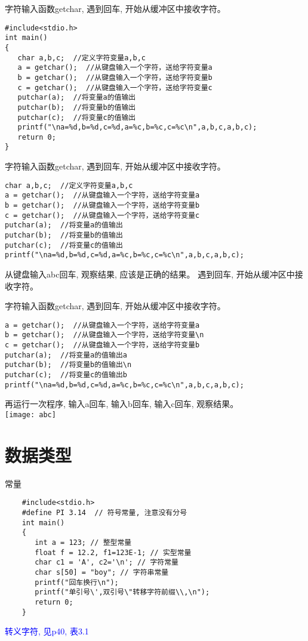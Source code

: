 \begin{frame}[fragile]{字符输入函数getchar, 遇到回车, 开始从缓冲区中接收字符。}
\begin{lstlisting}
#include<stdio.h>
int main()
{
   char a,b,c;  //定义字符变量a,b,c
   a = getchar();  //从键盘输入一个字符，送给字符变量a
   b = getchar();  //从键盘输入一个字符，送给字符变量b
   c = getchar();  //从键盘输入一个字符，送给字符变量c
   putchar(a);  //将变量a的值输出
   putchar(b);  //将变量b的值输出 
   putchar(c);  //将变量c的值输出
   printf("\na=%d,b=%d,c=%d,a=%c,b=%c,c=%c\n",a,b,c,a,b,c);
   return 0;
}
\end{lstlisting}
\end{frame}

\begin{frame}[fragile]{字符输入函数getchar, 遇到回车, 开始从缓冲区中接收字符。}
\begin{lstlisting}
char a,b,c;  //定义字符变量a,b,c
a = getchar();  //从键盘输入一个字符，送给字符变量a
b = getchar();  //从键盘输入一个字符，送给字符变量b
c = getchar();  //从键盘输入一个字符，送给字符变量c
putchar(a);  //将变量a的值输出
putchar(b);  //将变量b的值输出 
putchar(c);  //将变量c的值输出
printf("\na=%d,b=%d,c=%d,a=%c,b=%c,c=%c\n",a,b,c,a,b,c);
\end{lstlisting}
从键盘输入abc回车, 观察结果, 应该是正确的结果。
遇到回车, 开始从缓冲区中接收字符。
\end{frame}

\begin{frame}[fragile]{字符输入函数getchar, 遇到回车, 开始从缓冲区中接收字符。}
\begin{lstlisting}
a = getchar();  //从键盘输入一个字符，送给字符变量a
b = getchar();  //从键盘输入一个字符，送给字符变量\n
c = getchar();  //从键盘输入一个字符，送给字符变量b
putchar(a);  //将变量a的值输出a
putchar(b);  //将变量b的值输出\n 
putchar(c);  //将变量c的值输出b
printf("\na=%d,b=%d,c=%d,a=%c,b=%c,c=%c\n",a,b,c,a,b,c);
\end{lstlisting}
再运行一次程序, 输入a回车, 输入b回车, 输入c回车, 观察结果。\\
\texttt{[image: abc]}
\end{frame}

\section{数据类型}

\begin{frame}[fragile]{常量}
    \begin{lstlisting}
    #include<stdio.h> 
    #define PI 3.14  // 符号常量, 注意没有分号           
    int main()                   
    {                            
       int a = 123; // 整型常量
       float f = 12.2, f1=123E-1; // 实型常量
       char c1 = 'A', c2='\n'; // 字符常量
       char s[50] = "boy"; // 字符串常量      
       printf("回车换行\n");
       printf("单引号\',双引号\"转移字符前缀\\,\n");  
       return 0;           
    }                            
    \end{lstlisting}
    \textcolor{blue}{转义字符, 见p40, 表3.1}
\end{frame}

